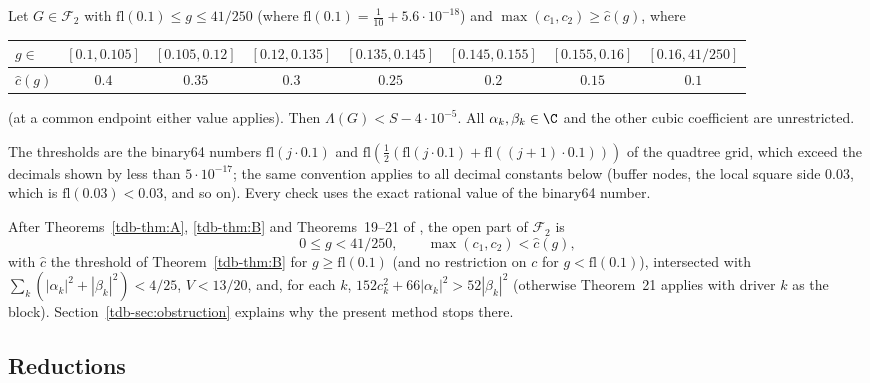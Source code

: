 \begin{theorem}\label{tdb-thm:B}
Let $G\in\mathcal F_2$ with $\mathrm{fl}(0.1)\le g\le41/250$ (where $\mathrm{fl}(0.1)=\frac1{10}+5.6\cdot10^{-18}$) and $\max(c_1,c_2)\ge\hat c(g)$, where
\begin{center}\small
\begin{tabular}{l|ccccccc}
$g\in$ & $[0.1,0.105]$ & $[0.105,0.12]$ & $[0.12,0.135]$ & $[0.135,0.145]$ & $[0.145,0.155]$ & $[0.155,0.16]$ & $[0.16,41/250]$\\\hline
$\hat c(g)$ & $0.4$ & $0.35$ & $0.3$ & $0.25$ & $0.2$ & $0.15$ & $0.1$
\end{tabular}
\end{center}
(at a common endpoint either value applies). Then $\Lambda(G)<S-4\cdot10^{-5}$. All $\alpha_k,\beta_k\in\C$ and the other cubic coefficient are
unrestricted.
\end{theorem}
The thresholds are the binary64 numbers $\mathrm{fl}(j\cdot0.1)$ and $\mathrm{fl}(\tfrac12(\mathrm{fl}(j\cdot0.1)+\mathrm{fl}((j+1)\cdot0.1)))$ of the quadtree
grid, which exceed the decimals shown by less than $5\cdot10^{-17}$; the same convention applies to all decimal constants below
(buffer nodes, the local square side $0.03$, which is $\mathrm{fl}(0.03)<0.03$, and so on). Every check uses the exact rational value of the binary64 number.

\begin{remark}
After Theorems~\ref{tdb-thm:A}, \ref{tdb-thm:B} and Theorems~19--21 of \Sd, the open part of $\mathcal F_2$ is
\[
0\le g<41/250,\qquad \max(c_1,c_2)<\hat c(g),
\]
with $\hat c$ the threshold of Theorem~\ref{tdb-thm:B} for $g\ge\mathrm{fl}(0.1)$ (and no restriction on $c$ for $g<\mathrm{fl}(0.1)$), intersected with $\sum_k(|\alpha_k|^2+|\beta_k|^2)<4/25$, $V<13/20$, and, for each $k$, $152c_k^2+66|\alpha_k|^2>52|\beta_k|^2$ (otherwise
Theorem~21 applies with driver $k$ as the block). Section~\ref{tdb-sec:obstruction} explains why the present method stops there.
\end{remark}

\subsection{Reductions}\label{tdb-sec:red}

